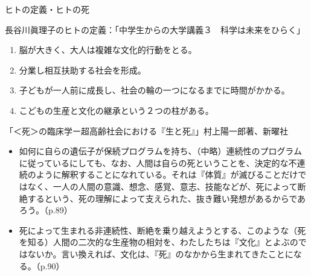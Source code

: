 \documentclass[10pt, dvipdfmx]{beamer}
\begin{document}
\begin{frame}{ヒトの定義・ヒトの死}%

\vspace*{-1ex}
\begin{block}{長谷川眞理子のヒトの定義：「中学生からの大学講義３　科学は未来をひらく」}
\begin{enumerate}
\item 脳が大きく、大人は複雑な文化的行動をとる。
\item 分業し相互扶助する社会を形成。
\item 子どもが一人前に成長し、社会の輪の一つになるまでに時間がかかる。%
\item こどもの生産と文化の継承という２つの柱がある。
\end{enumerate}
\end{block}

\begin{block}{「＜死＞の臨床学ー超高齢社会における『生と死』」村上陽一郎著、新曜社}
\begin{itemize}
\item 如何に自らの遺伝子が保続プログラムを持ち、（中略）連続性のプログラムに従っているにしても、なお、人間は自らの死ということを、決定的な不連続のように解釈することになれている。それは『体質』が滅びることだけではなく、一人の人間の意識、想念、感覚、意志、技能などが、死によって断絶するという、死の理解によって支えられた、抜き難い発想があるからであろう。（p.89）
\item 死によって生まれる非連続性、断絶を乗り越えようとする、このような（死を知る）人間の二次的な生産物の相対を、わたしたちは『文化』とよぶのではないか。言い換えれば、文化は、『死』のなかから生まれてきたことになる。（p.90）
\end{itemize}
\end{block}
\end{frame}
\end{document}
